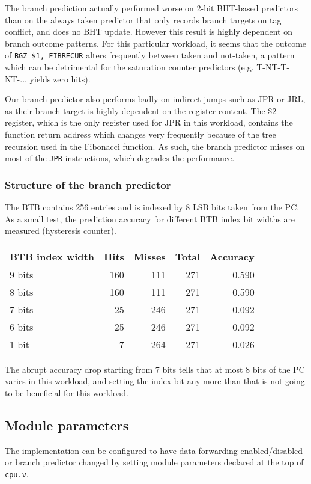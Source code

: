 \documentclass[12pt]{article}
\begin{document}
The branch prediction actually performed worse on 2-bit BHT-based
predictors than on the always taken predictor that only records branch
targets on tag conflict, and does no BHT update.  However this result
is highly dependent on branch outcome patterns.  For this particular
workload, it seems that the outcome of \verb|BGZ $1, FIBRECUR| alters
frequently between taken and not-taken, a pattern which can be
detrimental for the saturation counter predictors
(e.g. T-NT-T-NT-... yields zero hits).

Our branch predictor also performs badly on indirect jumps such as JPR
or JRL, as their branch target is highly dependent on the register
content.  The \$2 register, which is the only register used for JPR in
this workload, contains the function return address which changes very
frequently because of the tree recursion used in the Fibonacci
function.  As such, the branch predictor misses on most of the
\verb|JPR| instructions, which degrades the performance.

\subsubsection{Structure of the branch predictor}
The BTB contains 256 entries and is indexed by 8 LSB bits taken from
the PC.  As a small test, the prediction accuracy for different BTB
index bit widths are measured (hysteresis counter).

\begin{table}[ht]
  \centering
  \begin{tabular}{@{}lrrrr@{}} \toprule
    BTB index width & Hits & Misses & Total & Accuracy \\ \midrule
    9 bits & 160 & 111 & 271 & 0.590 \\
    8 bits & 160 & 111 & 271 & 0.590 \\
    7 bits & 25 & 246 & 271  & 0.092 \\
    6 bits & 25 & 246 & 271 & 0.092 \\
    1 bit & 7 & 264 & 271 & 0.026 \\
    \bottomrule
  \end{tabular}
\end{table}

The abrupt accuracy drop starting from 7 bits tells that at most 8
bits of the PC varies in this workload, and setting the index bit any
more than that is not going to be beneficial for this workload.

\subsection{Module parameters}
The implementation can be configured to have data forwarding
enabled/disabled or branch predictor changed by setting module
parameters declared at the top of \verb|cpu.v|.
\end{document}
